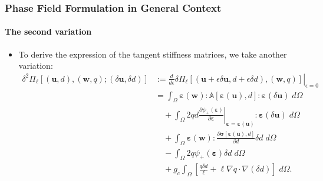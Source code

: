 \documentclass{beamer}
\newcommand{\SectionTwo}{Phase Field Formulation in General Context}
\begin{document}
\begin{frame}[label=subfstvariii]
	\frametitle{\SectionTwo}
	\framesubtitle{The second variation}
	\begin{itemize}
		\setlength\itemsep{2em}
		\item To derive the expression of the tangent stiffness matrices, we take another variation:
		\begin{equation*}
		\begin{aligned}
		\delta^2 \Pi_\ell[(\bm{u}, d), (\bm{w}, q); (\delta\bm{u}, \delta d)] &:=  \left.\frac{d}{d\epsilon} \delta \Pi_\ell[(\bm{u}+\epsilon\delta\bm{u}, d+\epsilon\delta d), (\bm{w}, q)]\right|_{\epsilon=0} \\
		&=\int_\Omega \bm{\varepsilon}(\bm{w}): \mathbb{A}[\bm{\varepsilon}(\bm{u}), d] : \bm{\varepsilon}(\delta\bm{u})  \;d\Omega \\
		&\quad + \int_\Omega 2 q d \left.\frac{\partial \psi_+(\bm{\varepsilon})}{\partial\bm{\varepsilon}}\right|_{\bm{\varepsilon}=\bm{\varepsilon}(\bm{u})} : \bm{\varepsilon}(\delta\bm{u}) \; d\Omega \\
		&\quad + \int_\Omega \bm{\varepsilon}(\bm{w}) : \frac{\partial\bm{\sigma}[\bm{\varepsilon}(\bm{u}), d]}{\partial d} \delta d  \;d\Omega \\
		&\quad - \int_\Omega 2 q \psi_+(\bm{\varepsilon}) \delta d \; d\Omega \\ 
		&\quad + g_c\int_\Omega  \left[\frac{q \delta d}{\ell} + \ell \nabla q \cdot \nabla (\delta d) \right]\;d\Omega.
		\end{aligned}
		\end{equation*}
	\end{itemize}
	\hyperlink{fenics}{}
\end{frame}
\end{document}

